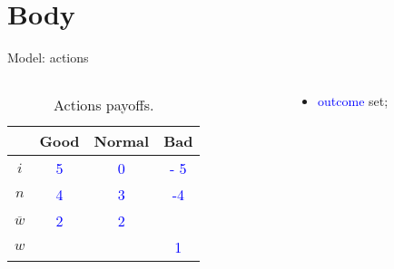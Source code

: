 \documentclass[usenames,dvipsnames,aspectratio=169,11pt, envcountsect, handout]{beamer}
\begin{document}
\section{Body}

\begin{frame}{Model: actions}

	\begin{columns}
		\begin{column}{0.45\textwidth}  %
			\begin{center}
				\begin{table}[H]
					\centering
					\begin{tabular}{c | c c c}
						                   & Good                & Normal              & Bad                   \\
						\hline
						\( i \)            & \textcolor{blue}{5} & \textcolor{blue}{0} & \textcolor{blue}{- 5} \\
						\( n \)            & \textcolor{blue}{4} & \textcolor{blue}{3} & \textcolor{blue}{-4}  \\
						\( \overline{w} \) & \textcolor{blue}{2} & \textcolor{blue}{2} &                       \\
						\( w \)            &                     &                     & \textcolor{blue}{1}   \\
					\end{tabular}
					\caption{Actions payoffs.}
					\label{tab:actions_inv1}
				\end{table}
			\end{center}
		\end{column}

		\begin{column}{0.55\textwidth}  %
			\begin{itemize}
				\item \textcolor{blue}{outcome} set;
			\end{itemize}
		\end{column}
	\end{columns}

\end{frame}
\end{document}
